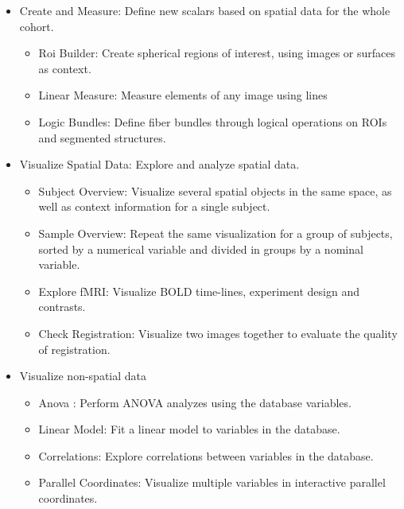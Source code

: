 \documentclass[utf8,paper]{frontiersSCNS} %
\begin{document}
\begin{itemize}
\item Create and Measure: Define new scalars based on spatial data for the whole cohort.
\begin{itemize}
\item Roi Builder: Create spherical regions of interest, using images or surfaces as context.
\item Linear Measure: Measure elements of any image using lines
\item Logic Bundles: Define fiber bundles through logical operations on ROIs and segmented structures.
\end{itemize}
\item Visualize Spatial Data: Explore and analyze spatial data.
\begin{itemize}
\item Subject Overview: Visualize several spatial objects in the same space, as well as context information for a single subject.
\item Sample Overview: Repeat the same visualization for a group of subjects, sorted by a numerical variable and divided in groups by a nominal variable.
\item Explore fMRI: Visualize BOLD time-lines, experiment design and contrasts.
\item Check Registration: Visualize two images together to evaluate the quality of registration. 
\end{itemize}
\item Visualize non-spatial data
\begin{itemize}
\item Anova : Perform ANOVA analyzes using the database variables.
\item Linear Model: Fit a linear model to variables in the database.
\item Correlations: Explore correlations between variables in the database.
\item Parallel Coordinates: Visualize multiple variables in interactive parallel coordinates.
\end{itemize}
\end{itemize} 
\end{document}
